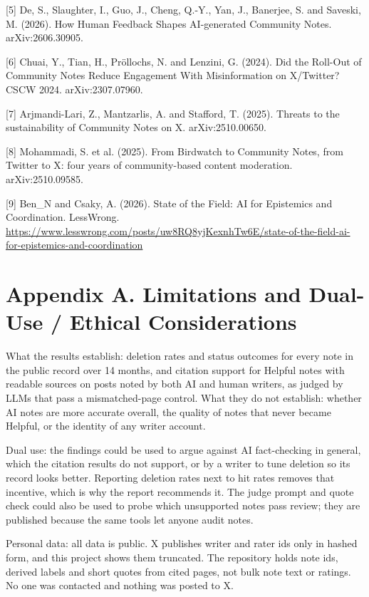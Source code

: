 \documentclass[10.5pt]{article}
\begin{document}
{\small [5] De, S., Slaughter, I., Guo, J., Cheng, Q.-Y., Yan, J., Banerjee, S. and Saveski, M. (2026). How Human Feedback Shapes AI-generated Community Notes. arXiv:2606.30905.}

{\small [6] Chuai, Y., Tian, H., Pröllochs, N. and Lenzini, G. (2024). Did the Roll-Out of Community Notes Reduce Engagement With Misinformation on X/Twitter? CSCW 2024. arXiv:2307.07960.}

{\small [7] Arjmandi-Lari, Z., Mantzarlis, A. and Stafford, T. (2025). Threats to the sustainability of Community Notes on X. arXiv:2510.00650.}

{\small [8] Mohammadi, S. et al. (2025). From Birdwatch to Community Notes, from Twitter to X: four years of community-based content moderation. arXiv:2510.09585.}

{\small [9] Ben\_N and Csaky, A. (2026). State of the Field: AI for Epistemics and Coordination. LessWrong. \url{https://www.lesswrong.com/posts/uw8RQ8yjKexnhTw6E/state-of-the-field-ai-for-epistemics-and-coordination}}

\section*{Appendix A. Limitations and Dual-Use / Ethical Considerations}
What the results establish: deletion rates and status outcomes for every note in the public record over 14 months, and citation support for Helpful notes with readable sources on posts noted by both AI and human writers, as judged by LLMs that pass a mismatched-page control. What they do not establish: whether AI notes are more accurate overall, the quality of notes that never became Helpful, or the identity of any writer account.

Dual use: the findings could be used to argue against AI fact-checking in general, which the citation results do not support, or by a writer to tune deletion so its record looks better. Reporting deletion rates next to hit rates removes that incentive, which is why the report recommends it. The judge prompt and quote check could also be used to probe which unsupported notes pass review; they are published because the same tools let anyone audit notes.

Personal data: all data is public. X publishes writer and rater ids only in hashed form, and this project shows them truncated. The repository holds note ids, derived labels and short quotes from cited pages, not bulk note text or ratings. No one was contacted and nothing was posted to X.
\end{document}
